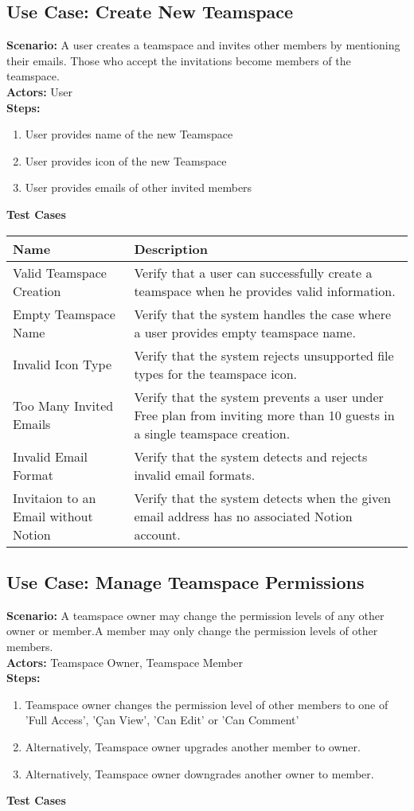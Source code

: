 \documentclass{article}
\begin{document}
\subsection{\textbf{Use Case: Create New Teamspace}}
\textbf{Scenario:} A user creates a teamspace and invites other members by mentioning their emails. Those who accept the invitations become members of the teamspace.\\
\textbf{Actors:} User\\
\textbf{Steps:}
\begin{enumerate}
\item User provides name of the new Teamspace
\item User provides icon of the new Teamspace
\item User provides emails of other invited members
\end{enumerate}
\textbf{Test Cases}

            \begin{longtable}{|p{}|p{}|}
            \hline
            \textbf{Name} & \textbf{Description} \\
            \hline
            Valid Teamspace Creation & Verify that a user can successfully create a teamspace when he provides valid information. \\
\hline
Empty Teamspace Name & Verify that the system handles the case where a user provides empty teamspace name. \\
\hline
Invalid Icon Type & Verify that the system rejects unsupported file types for the teamspace icon. \\
\hline
Too Many Invited Emails & Verify that the system prevents a user under Free plan from inviting more than 10 guests in a single teamspace creation. \\
\hline
Invalid Email Format & Verify that the system detects and rejects invalid email formats. \\
\hline
Invitaion to an Email without Notion & Verify that the system detects when the given email address has no associated Notion account. \\
\hline
\end{longtable}\subsection{\textbf{Use Case: Manage Teamspace Permissions}}
\textbf{Scenario:} A teamspace owner may change the permission levels of any other owner or member.A member may only change the permission levels of other members.\\
\textbf{Actors:} Teamspace Owner, Teamspace Member\\
\textbf{Steps:}
\begin{enumerate}
\item Teamspace owner changes the permission level of other members to one of 'Full Access', 'Çan View', 'Can Edit' or 'Can Comment'
\item Alternatively, Teamspace owner upgrades another member to owner.
\item Alternatively, Teamspace owner downgrades another owner to member.
\end{enumerate}
\textbf{Test Cases}
\end{document}
